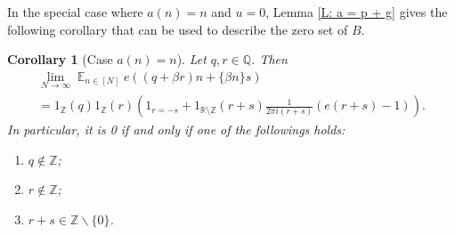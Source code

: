 \documentclass[11pt]{amsart}
\newtheorem{corollary}[lemma]{Corollary}
\theoremstyle{definition}
\DeclareMathOperator*{\E}{\mathbb{E}}
\newcommand{\N}{{\mathbb N}}
\newcommand{\Q}{{\mathbb Q}}
\newcommand{\R}{{\mathbb R}}
\newcommand{\Z}{{\mathbb Z}}
\newcommand{\1}{{\mathbf{1}}}
\newcommand{\brac}[1]{\mathopen{}\left( #1 \mathclose{}\right)}
\begin{document}
In the special case where $a(n) = n$ and $u=0$, Lemma \ref{L: a = p + g} gives the following corollary that can be used to describe the zero set of $B$.
\begin{corollary}[Case $a(n)=n$]\label{C: a = n}
Let $q,r\in\Q$.
Then
\begin{multline*}
    \lim_{N\to\infty}\E_{n\in[N]} e((q+\beta r)n +\{\beta n\}s)\\
    =     1_\Z(q) 1_\Z(r)
\brac{1_{r=-s} + 1_{\R\setminus\Z}(r+s)\frac{1}{2\pi i(r+s)}(e(r+s)-1)}.
\end{multline*}
    In particular, it is 0 if and only if one of the followings holds:
    \begin{enumerate}
        \item $q\notin\Z$;
    \item $r\notin \Z$;
    \item $r+s\in\mathbb{Z}\backslash\{0\}$.
\end{enumerate}
\end{corollary}
\end{document}
